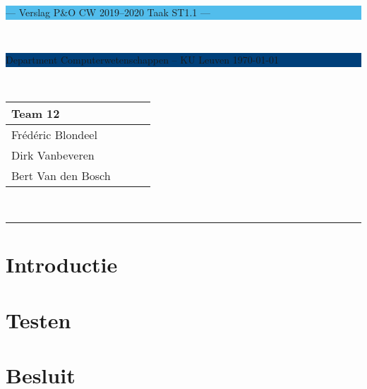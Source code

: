 \documentclass[a4paper,11pt]{article}
\begin{document}
\noindent
\colorbox[HTML]{52BDEC}{\bfseries\parbox{\textwidth}{\centering\large
  --- Verslag P\&O CW 2019--2020 Taak ST1.1 ---
}}
\\[-1mm]
\colorbox[HTML]{00407A}{\bfseries\color{white}\parbox{\textwidth}{
  Department Computerwetenschappen -- KU Leuven
  \hfill
  \today
}}
\\

\smallskip

\noindent
\begin{tabular}{*4l}
\toprule
\multicolumn{2}{l}{\large\textbf{Team 12}} \\
\midrule
Frédéric Blondeel \\ %
Dirk Vanbeveren \\
Bert Van den Bosch\\


\bottomrule
\hline
\end{tabular}\\

\noindent
{\color[HTML]{52BDEC} \rule{\linewidth}{1mm} }
\tableofcontents
\newpage
\section{Introductie}\label{sec:introductie}

\section{Testen}\label{sec:testen}

\section{Besluit}\label{sec:besluit}


\newpage


\end{document}
